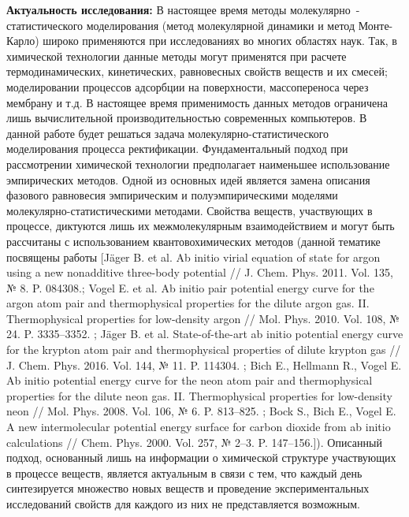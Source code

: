 \textbf{Актуальность исследования:}
В настоящее время методы молекулярно~- статистического моделирования (метод молекулярной динамики и метод Монте-Карло) широко применяются при исследованиях во многих областях наук. Так, в химической технологии данные методы могут применятся при расчете термодинамических, кинетических, равновесных свойств веществ и их смесей; моделировании процессов адсорбции на поверхности, массопереноса через мембрану и т.д. В настоящее время применимость данных методов ограничена лишь вычислительной производительностью современных компьютеров.
В данной работе будет решаться задача молекулярно-статистического моделирования процесса ректификации. Фундаментальный подход при рассмотрении химической технологии предполагает наименьшее использование эмпирических методов. Одной из основных идей является замена описания фазового равновесия эмпирическим и полуэмпирическими моделями молекулярно-статистическими методами. Свойства веществ, участвующих в процессе, диктуются лишь их межмолекулярным взаимодействием и могут быть рассчитаны с использованием квантовохимических методов (данной тематике посвящены работы [Jäger B. et al. Ab initio virial equation of state for argon using a new nonadditive three-body potential // J. Chem. Phys. 2011. Vol. 135, № 8. P. 084308.;	Vogel E. et al. Ab initio pair potential energy curve for the argon atom pair and thermophysical properties for the dilute argon gas. II. Thermophysical properties for low-density argon // Mol. Phys. 2010. Vol. 108, № 24. P. 3335–3352.
;	Jäger B. et al. State-of-the-art ab initio potential energy curve for the krypton atom pair and thermophysical properties of dilute krypton gas // J. Chem. Phys. 2016. Vol. 144, № 11. P. 114304.
;	Bich E., Hellmann R., Vogel E. Ab initio potential energy curve for the neon atom pair and thermophysical properties for the dilute neon gas. II. Thermophysical properties for low-density neon // Mol. Phys. 2008. Vol. 106, № 6. P. 813–825.
;	Bock S., Bich E., Vogel E. A new intermolecular potential energy surface for carbon dioxide from ab initio calculations // Chem. Phys. 2000. Vol. 257, № 2–3. P. 147–156.]). Описанный подход, основанный лишь на  информации о химической структуре участвующих в процессе веществ, является актуальным в связи с тем, что каждый день синтезируется множество новых веществ и проведение экспериментальных исследований свойств для каждого из них не представляется возможным.

